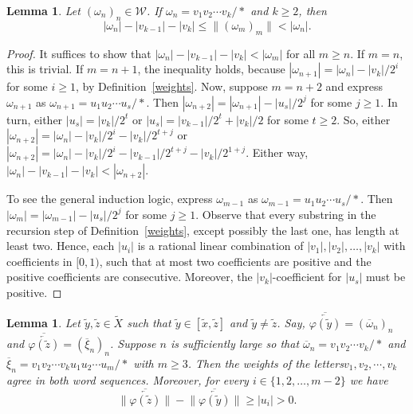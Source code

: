 \documentclass{amsart}
\newtheorem{lemma}[theorem]{Lemma}
\theoremstyle{definition}
\theoremstyle{remark}
\numberwithin{equation}{section}
\begin{document}
\begin{lemma}\label{two}
 Let $(\omega_n)_n\in {\mathcal W}$. If $\omega_n=v_1v_2\cdots v_k/\ast$ and $k\geqslant 2$, then  \[|\omega_n|-|v_{k-1}|-|v_k|\leqslant  \|(\omega_m)_m\| < |\omega_n|.\]
\end{lemma}

\begin{proof}
 It suffices to show that $|\omega_n|-|v_{k-1}|-|v_k|<|\omega_m|$ for all $m\geqslant n$. If $m=n$, this is trivial. If $m=n+1$, the inequality holds, because $|\omega_{n+1}|=|\omega_n|-|v_k|/2^i$ for some $i\geqslant 1$, by Definition~\ref{weights}. Now, suppose $m=n+2$ and express $\omega_{n+1}$ as  $\omega_{n+1}=u_1u_2\cdots u_s/\ast$. Then $|\omega_{n+2}|=|\omega_{n+1}|-|u_s|/2^j$ for some $j\geqslant 1$. In turn, either $|u_s|=|v_k|/2^t$ or $|u_s|=|v_{k-1}|/2^t+|v_k|/2$ for some $t\geqslant 2$. So, either $|\omega_{n+2}|=|\omega_n|-|v_k|/2^i-|v_k|/2^{t+j}$ or
$|\omega_{n+2}|=|\omega_n|-|v_k|/2^i-|v_{k-1}|/2^{t+j}-|v_k|/2^{1+j}$. Either way, $|\omega_n|-|v_{k-1}|-|v_k|<|\omega_{n+2}|$.

To see the general induction logic, express $\omega_{m-1}$ as
$\omega_{m-1}=u_1u_2\cdots u_s/\ast$. Then $|\omega_{m}|=|\omega_{m-1}|-|u_s|/2^j$ for some $j\geqslant 1$. Observe that every substring
 in the recursion step of Definition~\ref{weights}, except possibly the last one, has length at least two. Hence, each
 $|u_i|$ is a rational linear combination of $|v_1|, |v_2|, \ldots,|v_k|$ with coefficients in $[0,1)$, such that at most two coefficients are positive and the positive coefficients are consecutive. Moreover,
 the $|v_{k}|$-coefficient for $|u_s|$ must be positive.
\end{proof}

\begin{lemma}\label{three} Let $\tilde{y},\tilde{z}\in \tilde{X}$ such that $\tilde{y}\in [\tilde{x},\tilde{z}]$ and $\tilde{y}\not=\tilde{z}$.
 Say, $\overline{\overleftarrow{\varphi(\tilde{y})}}=(\overline{\omega}_n)_n$ and $\overline{\overleftarrow{\varphi(\tilde{z})}}=(\overline{\xi}_n)_n$. Suppose $n$ is sufficiently large so that
   $\overline{\omega}_n=v_1v_2\cdots v_k/\ast$ and \linebreak $\overline{\xi}_n=v_1v_2\cdots v_k u_1 u_2 \cdots u_m/\ast$ with $m\geqslant 3$. Then the weights of the letters\linebreak  $v_1, v_2, \cdots, v_k$ agree in both word sequences. Moreover,  for every $i\in\{1, 2,\dots, m-2\}$ we have  \[\Big\|\overline{\overleftarrow{\varphi(\tilde{z})}}\Big\|-\Big\|\overline{\overleftarrow{\varphi(\tilde{y})}}\Big\|\geqslant |u_{i}|>0.\]
\end{lemma}
\end{document}
